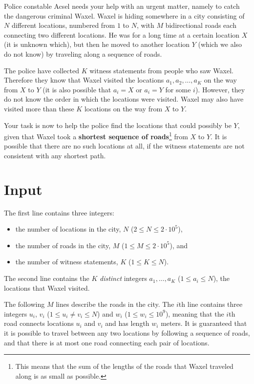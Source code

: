 \noindent
Police constable Acsel needs your help with an urgent matter, namely to catch the dangerous criminal Waxel.
Waxel is hiding somewhere in a city consisting of $N$ different locations, numbered from $1$ to $N$, with $M$ bidirectional roads each connecting two different locations.
He was for a long time at a certain location $X$ (it is unknown which), but then he moved to another location $Y$ (which we also do not know) by traveling along a sequence of roads.

The police have collected $K$ witness statements from people who saw Waxel.
Therefore they know that Waxel visited the locations $a_1, a_2, \dots, a_K$ on the way from $X$ to $Y$ (it is also possible that $a_i = X$ or $a_i = Y$ for some $i$).
However, they do not know the order in which the locations were visited.
Waxel may also have visited more than these $K$ locations on the way from $X$ to $Y$.

Your task is now to help the police find the locations that could possibly be $Y$, given that Waxel took a \textbf{shortest sequence of roads}\footnote{This means that the sum of the lengths of the roads that Waxel traveled along is as small as possible.} from $X$ to $Y$.
It is possible that there are no such locations at all, if the witness statements are not consistent with any shortest path.

\section*{Input}
The first line contains three integers:
\begin{itemize}
\item the number of locations in the city, $N$ ($2 \leq N \leq 2\cdot 10^5$),
\item the number of roads in the city, $M$ ($1 \leq M \leq 2 \cdot 10^5$), and
\item the number of witness statements, $K$ ($1 \leq K \leq N$).
\end{itemize}

The second line contains the $K$ \emph{distinct} integers $a_1, \dots, a_K$ ($1 \leq a_i \leq N$), the locations that Waxel visited.

The following $M$ lines describe the roads in the city.
The $i$th line contains three integers $u_i$, $v_i$ ($1 \leq u_i \not= v_i \le N$) and $w_i$ ($1 \leq w_i \leq 10^9$), meaning that the $i$th road connects locations $u_i$ and $v_i$ and has length $w_i$ meters.
It is guaranteed that it is possible to travel between any two locations by following a sequence of roads, and that there is at most one road connecting each pair of locations.

